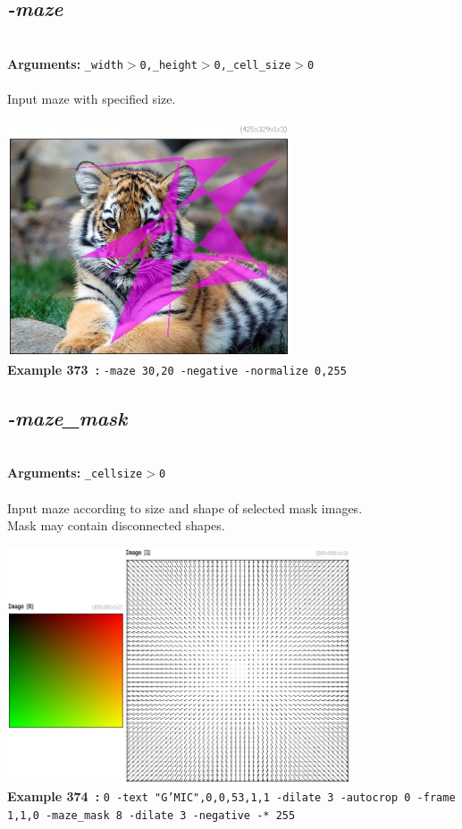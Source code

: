 \documentclass[a4paper,11pt,twoside]{book}
\begin{document}
\subsection{\emph{-maze} }\vspace*{-0.5em}
~\\\textbf{Arguments: } 
{\small \texttt{\_width$>$0,\_height$>$0,\_cell\_size$>$0}}\\~\\
Input maze with specified size.
\begin{center}\includegraphics[keepaspectratio=true,height=7cm,width=\textwidth]{img/gmic_def373.jpg}\\
{\footnotesize \textbf{Example 373~:} \texttt{-maze 30,20 -negative -normalize 0,255}}
\end{center}

\subsection{\emph{-maze\_mask} }\vspace*{-0.5em}
~\\\textbf{Arguments: } 
{\small \texttt{\_cellsize$>$0}}\\~\\
Input maze according to size and shape of selected mask images.
~\\Mask may contain disconnected shapes.
\begin{center}\includegraphics[keepaspectratio=true,height=7cm,width=\textwidth]{img/gmic_def374.jpg}\\
{\footnotesize \textbf{Example 374~:} \texttt{0 -text "G'MIC",0,0,53,1,1 -dilate 3 -autocrop 0 -frame 1,1,0 -maze\_mask 8 -dilate 3 -negative -* 255}}
\end{center}
\end{document}
